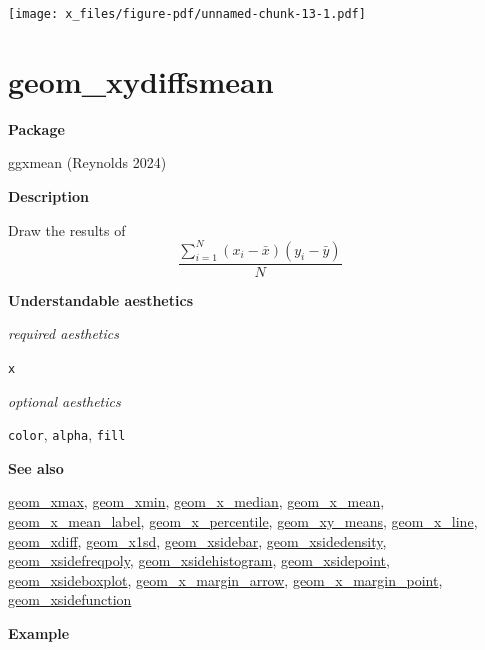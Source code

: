 \documentclass[
  letterpaper,
  DIV=11,
  numbers=noendperiod]{scrreprt}
\begin{document}
\texttt{[image: x\_files/figure-pdf/unnamed-chunk-13-1.pdf]}

\section{geom\_xydiffsmean}\label{xydiffsmean}

\textbf{Package}

ggxmean (Reynolds 2024)

\textbf{Description}

Draw the results of
\[\frac{\sum_{i=1}^{N}(x_i-\bar{x})(y_i-\bar{y})}{N}\]

\textbf{Understandable aesthetics}

\emph{required aesthetics}

\texttt{x}

\emph{optional aesthetics}

\texttt{color}, \texttt{alpha}, \texttt{fill}

\textbf{See also}

\href{@xmax}{geom\_xmax}, \href{@xmin}{geom\_xmin},
\href{@x_median}{geom\_x\_median}, \href{@x_mean}{geom\_x\_mean},
\href{@x_mean_label}{geom\_x\_mean\_label},
\href{@x_percentile}{geom\_x\_percentile},
\href{@xy_means}{geom\_xy\_means}, \href{@x_line}{geom\_x\_line},
\href{@xdiff}{geom\_xdiff}, \href{@x1sd}{geom\_x1sd},
\href{@xsidebar}{geom\_xsidebar},
\href{@xsidedensity}{geom\_xsidedensity},
\href{@xsidefreqpoly}{geom\_xsidefreqpoly},
\href{@xsidehistogram}{geom\_xsidehistogram},
\href{@xsidepoint}{geom\_xsidepoint},
\href{@xsideboxplot}{geom\_xsideboxplot},
\href{@x_margin_arrow}{geom\_x\_margin\_arrow},
\href{@x_margin_point}{geom\_x\_margin\_point},
\href{@xsidefunction}{geom\_xsidefunction}

\textbf{Example }
\end{document}
